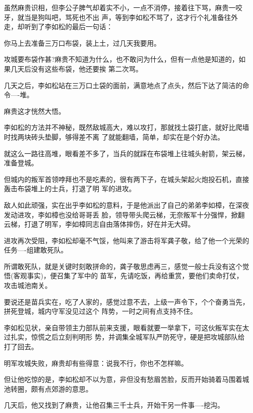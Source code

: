 \documentclass[11pt,a4paper,onecolumn]{article}
\begin{document}
虽然麻贵识相，但李公子脾气却着实不小，一点不消停，接着往下骂，麻贵一咬牙，就当是狗叫吧，骂死也不出
声，等到李如松不骂了，这才行个礼准备往外走，却听到了李如松的最后一句话：

你马上去准备三万口布袋，装上土，过几天我要用。

攻城要布袋作甚?麻贵不知道为什么，也不敢问为什么，但有一点他是知道的，如果几天后没有这些布袋，他还要挨
第二次骂。

几天之后，李如松站在三万口土袋的面前，满意地点了点头，然后下达了简洁的命令----堆。

麻贵这才恍然大悟。

李如松的方法并不神秘，既然敌城高大，难以攻打，那就找土袋打底，就好比爬墙时找两块砖头垫脚，够得差不离
了就能翻墙，简单，却实在是个好办法。

就这么一路往高堆，眼看差不多了，当兵的就踩在布袋堆上往城头射箭，架云梯，准备登城。

但城内的叛军首领哱拜也不是吃素的，很有两下子，在城头架起火炮投石机，直接轰击布袋堆上的士兵，打退了明
军的进攻。

敌人如此顽强，实在出乎李如松的意料，于是他派出了自己的弟弟李如樟，在深夜发动进攻，李如樟也没给哥哥丢
脸，领导带头爬云梯，无奈叛军十分强悍，掀翻云梯，打退了明军，李如樟同志自由落体摔伤，好在并无大碍。

进攻再次受阻，李如松却毫不气馁，他叫来了游击将军龚子敬，给了他一个光荣的任务----组建敢死队。

所谓敢死队，就是关键时刻敢拼命的，龚子敬思虑再三，感觉一般士兵没有这个觉悟(客观事实)，便召集了军中的
苗军，先请吃饭，再给重赏，要他们卖命打仗，攻击城池南关。

要说还是苗兵实在，吃了人家的，感觉过意不去，上级一声令下，个个奋勇当先，拼死登城，城内守军没见过这个
阵势，一时之间有点支持不住。

李如松见状，亲自带领主力部队前来支援，眼看就要一举拿下，可这伙叛军实在太过扎实，惊慌之后立刻判明形
势，并调集全城军队严防死守，硬是把攻城部队给打了回去。

明军攻城失败，麻贵却有些得意：说我不行，你也不怎样嘛。

但让他吃惊的是，李如松却不以为意，非但没有愁眉苦脸，反而开始骑着马围着城池转圈，颇有点郊游的意思。

几天后，他又找到了麻贵，让他召集三千士兵，开始干另一件事----挖沟。

\section[\thesection]{}
\end{document}
